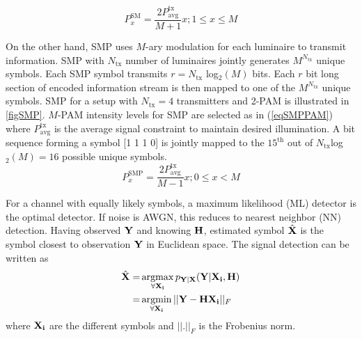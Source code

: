 \begin{equation}
	\label{eqSMPAM}
	P_{x}^{\text{SM}} = \frac{2P^{\text{tx}}_{\text{avg}}}{M+1}x; 1 \leq x \leq M
\end{equation}

On the other hand, SMP uses $M$-ary modulation for each luminaire to transmit information. SMP with $N_{\text{tx}}$ number of luminaires jointly generates $M^{N_{\text{tx}}}$ unique symbols. Each SMP symbol transmits $r=N_{\text{tx}}$ log$^{ }_{2}(M)$ bits. Each $r$ bit long section of encoded information stream is then mapped to one of the $M^{N_{\text{tx}}}$ unique symbols. SMP for a setup with $N_{\text{tx}}=4$ transmitters and 2-PAM is illustrated in \figurename{ \ref{figSMP}}. $M$-PAM intensity levels for SMP are selected as in (\ref{eqSMPPAM}) where $P^{\text{tx}}_{\text{avg}}$ is the average signal constraint to maintain desired illumination. A bit sequence forming a symbol [1 1 1 0] is jointly mapped to the $15^{\text{th}}$ out of $N_{\text{tx}}$log$^{ }_{2}(M)=16$ possible unique symbols.
\begin{equation}
	\label{eqSMPPAM}
	P_{x}^{\text{SMP}} = \frac{2P^{\text{tx}}_{\text{avg}}}{M-1}x; 0\leq x < M
\end{equation}

For a channel with equally likely symbols, a maximum likelihood (ML) detector is the optimal detector. If noise is AWGN, this reduces to nearest neighbor (NN) detection. Having observed ${\bf{Y}}$ and knowing ${\bf{H}}$, estimated symbol $\hat{{\bf{X}}}$ is the symbol closest to observation ${\bf{Y}}$ in Euclidean space. The signal detection can be written as
\begin{gather}
\begin{aligned}
	\hat{{\bf{X}}} =&{} \argmax_{\forall{\bf{X_i}}} p_{{\bf{Y}}|{\bf{X}}}({\bf{Y}}|{\bf{X_i}},{\bf{H}})\\
	=&{} \argmin_{\forall{\bf{X_i}}} ||{\bf{Y}}-{\bf{H}}{\bf{X_i}}||_{F}
\label{eq:ML}
\end{aligned}
\end{gather}
where ${\bf{X_i}}$ are the different symbols and $||.||_{F}$ is the Frobenius norm.

